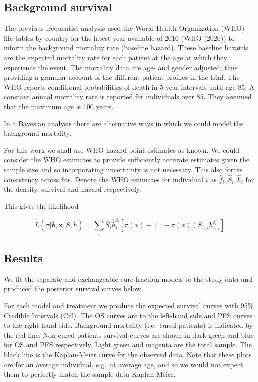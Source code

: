 \documentclass[
]{article}
\begin{document}
\hypertarget{background-survival}{%
\subsection{Background survival}\label{background-survival}}

The previous frequentist analysis used the World Health Organization
(WHO) life tables by country for the latest year available of 2016 (WHO
(2020)) to inform the background mortality rate (baseline hazard). These
baseline hazards are the expected mortality rate for each patient at the
age at which they experience the event. The mortality data are age- and
gender adjusted, thus providing a granular account of the different
patient profiles in the trial. The WHO reports conditional probabilities
of death in 5-year intervals until age 85. A constant annual mortality
rate is reported for individuals over 85. They assumed that the maximum
age is 100 years.

In a Bayesian analysis there are alternative ways in which we could
model the background mortality.

For this work we shall use WHO hazard point estimates as known. We could
consider the WHO estimates to provide sufficiently accurate estimates
given the sample size and so incorporating uncertainty is not necessary.
This also forces consistency across fits. Denote the WHO estimates for
individual \(i\) as \(\hat{f}_i, \hat{S}_i, \hat{h}_i\) for the density,
survival and hazard respectively.

This gives the likelihood

\[
L(\pi | \boldsymbol{\delta}, \boldsymbol{x}, \hat{S}, \hat{h}) =
\sum_i \hat{S}_i \hat{h}_i^{\delta_i} \left[ \pi(x) + (1 - \pi(x)) S_{u, i} h_{u , i}^{\delta_i} \right]
\]

\hypertarget{results}{%
\subsection{Results}\label{results}}

We fit the separate and exchangeable cure fraction models to the study
data and produced the posterior survival curves below.

For each model and treatment we produce the expected survival curves
with 95\% Credible Intervals (CrI). The OS curves are to the left-hand
side and PFS curves to the right-hand side. Background mortality
(i.e.~cured patients) is indicated by the red line. Non-cured patients
survival curves are shown in dark green and blue for OS and PFS
respectively. Light green and magenta are the total sample. The black
line is the Kaplan-Meier curve for the observed data. Note that these
plots are for an average individual, e.g.~at average age, and so we
would not expect them to perfectly match the sample data Kaplan-Meier.
\end{document}
